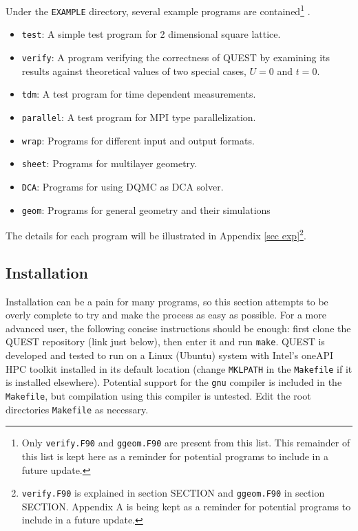 \documentclass[12pt]{article}
\begin{document}
        Under the \verb"EXAMPLE" directory, several example programs are contained\footnote{Only \texttt{verify.F90} and \texttt{ggeom.F90} are present from this list. This remainder of this list is kept here as a reminder for potential programs to include in a future update.} .
        \begin{itemize}
        \item \verb"test": A simple test program for 2 dimensional square lattice.
        \item \verb"verify": A program verifying the correctness of QUEST by examining its results against theoretical values of two special cases, $U=0$ and $t=0$.
        \item \verb"tdm": A test program for time dependent measurements.
        \item \verb"parallel": A test program for MPI type parallelization.
        \item \verb"wrap": Programs for different input and output formats.
        \item \verb"sheet": Programs for multilayer geometry.
        \item \verb"DCA": Programs for using DQMC as DCA solver.
        \item \verb"geom": Programs for general geometry and their simulations
        \end{itemize}
        The details for each program will be illustrated in Appendix \ref{sec exp}\footnote{\texttt{verify.F90} is explained in section SECTION and \texttt{ggeom.F90} in section SECTION. Appendix A is being kept as a reminder for potential programs to include in a future update.}.

    \subsection{Installation}\label{sec install}
        Installation can be a pain for many programs, so this section attempts to be overly complete to try and make the process as easy as possible.
        For a more advanced user, the following concise instructions should be enough: first clone the QUEST repository (link just below), then enter it and run \texttt{make}.
        QUEST is developed and tested to run on a Linux (Ubuntu) system with Intel's oneAPI HPC toolkit installed in its default location (change \texttt{MKLPATH} in the \texttt{Makefile} if it is installed elsewhere).
        Potential support for the \texttt{gnu} compiler is included in the \texttt{Makefile}, but compilation using this compiler is untested.
        Edit the root directories \texttt{Makefile} as necessary. \\
\end{document}
